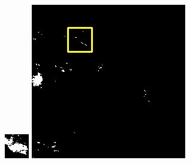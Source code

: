 \documentclass[10pt]{ctexart}
\begin{document}
\begin{multicols}{2}
\begin{figure}[H]
{\begin{minipage}[b]{0.15\linewidth}
            \includegraphics[width=1\linewidth]{../log/spoon2/cut2/tmp_cut_LC81620432014072LGN00_16237_my.jpg}\vspace{4pt}
            \includegraphics[width=1\linewidth]{../log/spoon2/cut2/LC81620432014072LGN00_16329_my.jpg}\vspace{4pt}

\end{minipage}}
\end{figure}
\end{multicols}
\end{document}
